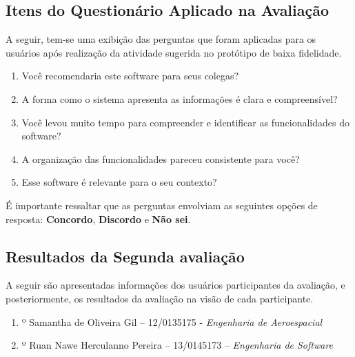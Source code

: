 		\subsection[Itens do Questionário Aplicados na Avaliação]{Itens do Questionário Aplicado na Avaliação}
		\label{sec:segundaAvaliacao_Questionario}

			A seguir, tem-se uma exibição das perguntas que foram aplicadas para os usuários após realização da atividade sugerida no protótipo de baixa fidelidade.

			\begin{enumerate}
				\item{Você recomendaria este software para seus colegas?}
				\item{A forma como o sistema apresenta as informações é clara e compreensível?}
				\item{Você levou muito tempo para compreender e identificar as funcionalidades do software?}
				\item{A organização das funcionalidades pareceu consistente para você?}
				\item{Esse software é relevante para o seu contexto?}
			\end{enumerate}

			É importante ressaltar que as perguntas envolviam as seguintes opções de resposta: \textbf{Concordo}, \textbf{Discordo} e \textbf{Não sei}.

		\subsection[Resultados da Segunda Avaliação]{Resultados da Segunda avaliação}
		\label{sec:segundaAvaliacao_Resultados}

			A seguir são apresentadas informações dos usuários participantes da avaliação, e posteriormente, os resultados da avaliação na visão de cada participante.

			\begin{enumerate}
				\item{º Samantha de Oliveira Gil – 12/0135175 - \emph{Engenharia de Aeroespacial}}
				\item{º Ruan Nawe Herculanno Pereira – 13/0145173 – \emph{Engenharia de Software}}
			\end{enumerate}

